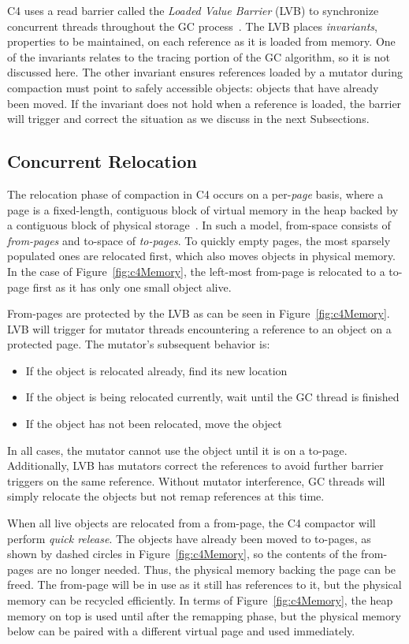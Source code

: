 \documentclass{sig-alternate}
\begin{document}
C4 uses a read barrier called the \emph{Loaded Value Barrier} (LVB) to 
synchronize concurrent threads throughout the GC process~\cite{Tene:C4}. The LVB 
places \emph{invariants}, properties to be maintained, on each reference as it is loaded from memory.
One of the invariants relates to the tracing portion of the GC algorithm, so
it is not discussed here. The other invariant ensures
references loaded by a mutator during compaction must point to safely
accessible objects: objects that have already been moved.
If the invariant does not hold
when a reference is loaded, the barrier will trigger and correct
the situation as we discuss in the next Subsections.


\subsection{Concurrent Relocation}
\label{sec:c4Relocation}

The relocation phase of compaction in C4 occurs on a per-\emph{page}
basis, where a page is a fixed-length, contiguous block of virtual memory in the heap
backed by a contiguous block of physical storage~\cite{Tene:C4}.
In such a model, from-space consists of \emph{from-pages}
and to-space of \emph{to-pages}.
To quickly empty pages, the most sparsely populated ones are relocated
first, which also moves objects in physical memory. In the case of Figure~\ref{fig:c4Memory}, the left-most 
from-page is relocated to a to-page first as it has only one small object alive.

From-pages are protected by the LVB as can be seen in Figure~\ref{fig:c4Memory}. 
LVB will trigger for mutator threads encountering a reference to an object
on a protected page. The mutator's subsequent behavior is:
\begin{itemize}
\item If the object is relocated already, find its new location
\item If the object is being relocated currently, wait until the GC thread is finished
\item If the object has not been relocated, move the object 
\end{itemize}
In all cases, the mutator cannot use the object until it is on a to-page.
Additionally, LVB has mutators correct the
references to avoid further barrier triggers on the same
reference.
Without mutator interference, GC threads will simply relocate the objects but
not remap references at this time. 

When all live objects are relocated from a from-page,
the C4 compactor will perform \emph{quick release}. 
The objects have already 
been moved to to-pages, as shown by dashed circles in Figure~\ref{fig:c4Memory}, 
so the contents of the from-pages are no longer needed. Thus, the physical 
memory backing the page can be freed. The from-page 
will be in use as it still has references to it, but the physical memory can be recycled efficiently. 
In terms of Figure~\ref{fig:c4Memory}, the heap
memory on top is used until after the remapping phase, but the physical memory below 
can be paired with a different virtual page and used immediately.
\end{document}

